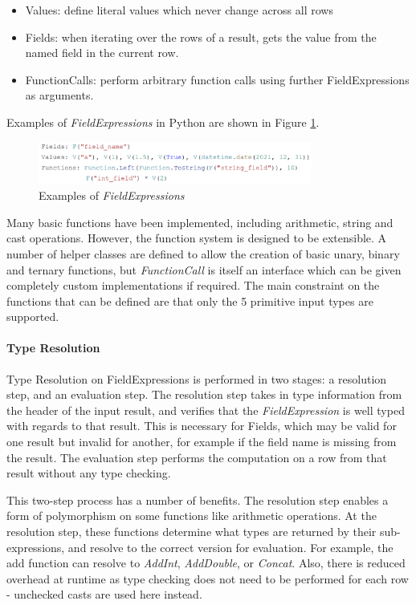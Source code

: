 \begin{itemize}
	\item Values: define literal values which never change across all rows
	\item Fields: when iterating over the rows of a result, gets the value from the named field in the current row.
	\item FunctionCalls: perform arbitrary function calls using further FieldExpressions as arguments.
\end{itemize}

Examples of \textit{FieldExpressions} in Python are shown in Figure \ref{fig:field-expressions-examples}.

\begin{figure}[h]
	\centering
	\includegraphics[width=0.8\textwidth]{chapters/diagrams/implementation/field-expressions-examples}
	\caption{Examples of \textit{FieldExpressions}}
	\label{fig:field-expressions-examples}
\end{figure}

Many basic functions have been implemented, including arithmetic, string and cast operations. However, the function system is designed to be extensible. A number of helper classes are defined to allow the creation of basic unary, binary and ternary functions, but \textit{FunctionCall} is itself an interface which can be given completely custom implementations if required. The main constraint on the functions that can be defined are that only the 5 primitive input types are supported.

\paragraph{Type Resolution} 
Type Resolution on FieldExpressions is performed in two stages: a resolution step, and an evaluation step. The resolution step takes in type information from the header of the input result, and verifies that the \textit{FieldExpression} is well typed with regards to that result. This is necessary for Fields, which may be valid for one result but invalid for another, for example if the field name is missing from the result. The evaluation step performs the computation on a row from that result without any type checking. 

This two-step process has a number of benefits. The resolution step enables a form of polymorphism on some functions like arithmetic operations. At the resolution step, these functions determine what types are returned by their sub-expressions, and resolve to the correct version for evaluation. For example, the add function can resolve to \textit{AddInt}, \textit{AddDouble}, or \textit{Concat}. Also, there is reduced overhead at runtime as type checking does not need to be performed for each row - unchecked casts are used here instead.


